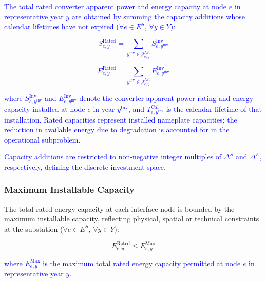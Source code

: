 \documentclass[preprint,12pt]{elsarticle}
\begin{document}
\textcolor{blue}{
    The total rated converter apparent power and energy capacity at node $e$ in representative year $y$ are obtained by summing the capacity additions whose calendar lifetimes have not expired ($\forall e\in E^S$, $\forall y\in Y$):
}

\textcolor{blue}{
    \begin{equation}
        S^{\text{Rated}}_{e,y}
        =
        \sum_{y^{\text{Inv}}\in\mathcal{Y}^{\text{Act}}_{e,y}}
        S^{\text{Inv}}_{e,y^{\text{Inv}}}
        \label{eq:master_rated_s}
    \end{equation}
}

\textcolor{blue}{
    \begin{equation}
        E^{\text{Rated}}_{e,y}
        =
        \sum_{y^{\text{Inv}}\in\mathcal{Y}^{\text{Act}}_{e,y}}
        E^{\text{Inv}}_{e,y^{\text{Inv}}}
    \end{equation}
}

\noindent
\textcolor{blue}{
    where 
    $S^{\text{Inv}}_{e,y^{\text{Inv}}}$ and $E^{\text{Inv}}_{e,y^{\text{Inv}}}$ denote the converter apparent-power rating and energy capacity installed at node $e$ in year $y^{\text{Inv}}$, and
    $T^{\text{Cal}}_{e,y^{\text{Inv}}}$ is the calendar lifetime of that installation. 
    Rated capacities represent installed nameplate capacities; the reduction in available energy due to degradation is accounted for in the operational subproblem.
}

\textcolor{blue}{
    Capacity additions are restricted to non-negative integer multiples of $\Delta^S$ and $\Delta^E$, respectively, defining the discrete investment space.
}

\subsubsection{Maximum Installable Capacity}

The total rated energy capacity at each interface node is bounded by the maximum installable capacity, reflecting physical, spatial or technical constraints at the substation ($\forall e\in E^S$, $\forall y\in Y$):

\begin{equation}
    E_{e,y}^{\text{Rated}} \leq E^{\text{Max}}_{e,y}
\end{equation}

\noindent
\textcolor{blue}{
    where $E^{\text{Max}}_{e,y}$ is the maximum total rated energy capacity permitted at node $e$ in representative year $y$.
}
\end{document}
